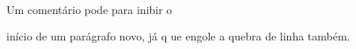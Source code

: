 Um comentário pode para inibir o%

início de um parágrafo novo, já q%
ue engole a quebra de linha também.

